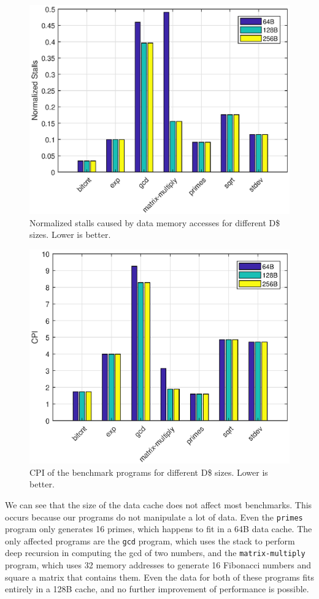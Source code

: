\documentclass[conference,hidelinks]{IEEEtran}
\begin{document}
\begin{figure}[!htb]
  \centering
  \includegraphics[width=0.8\columnwidth]{plots/data_cache_stalls.eps}
  \caption{Normalized stalls caused by data memory accesses for different D\$ sizes. Lower is better.}
  \label{fig:data_cache_stalls}
\end{figure}

\begin{figure}[!htb]
  \centering
  \includegraphics[width=0.8\columnwidth]{plots/data_cache_cpi.eps}
  \caption{CPI of the benchmark programs for different D\$ sizes. Lower is better.}
  \label{fig:data_cache_cpi}
\end{figure}

We can see that the size of the data cache does not affect most benchmarks. This occurs because our programs do not manipulate a lot of data. Even the \texttt{primes} program only generates 16 primes, which happens to fit in a 64B data cache. The only affected programs are the \texttt{gcd} program, which uses the stack to perform deep recursion in computing the gcd of two numbers, and the \texttt{matrix-multiply} program, which uses 32 memory addresses to generate 16 Fibonacci numbers and square a matrix that contains them. Even the data for both of these programs fits entirely in a 128B cache, and no further improvement of performance is possible.
\end{document}
